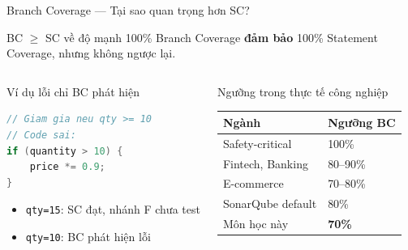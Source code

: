 \documentclass[aspectratio=169,12pt]{beamer}
\begin{document}
\begin{frame}[fragile,shrink=12]{Branch Coverage --- Tại sao quan trọng hơn SC?}
  \begin{block}{BC $\geq$ SC về độ mạnh}
    100\% Branch Coverage \textbf{đảm bảo} 100\% Statement Coverage,
    nhưng không ngược lại.
  \end{block}

  \vspace{0.4em}
  \begin{columns}
    \begin{exampleblock}{Ví dụ lỗi chỉ BC phát hiện}
\begin{lstlisting}[language=java,style=nonumber]
// Giam gia neu qty >= 10
// Code sai:
if (quantity > 10) {
    price *= 0.9;
}
\end{lstlisting}
      \begin{itemize}
        \item \texttt{qty=15}: SC đạt, nhánh F chưa test
        \item \texttt{qty=10}: BC phát hiện lỗi
      \end{itemize}
    \end{exampleblock}

    \begin{block}{Ngưỡng trong thực tế công nghiệp}
      \begin{tabular}{ll}
        \toprule
        \textbf{Ngành} & \textbf{Ngưỡng BC} \\
        \midrule
        Safety-critical & 100\% \\
        Fintech, Banking & 80--90\% \\
        E-commerce       & 70--80\% \\
        SonarQube default & 80\% \\
        Môn học này       & \textbf{70\%} \\
        \bottomrule
      \end{tabular}
    \end{block}
  \end{columns}
\end{frame}
\end{document}
